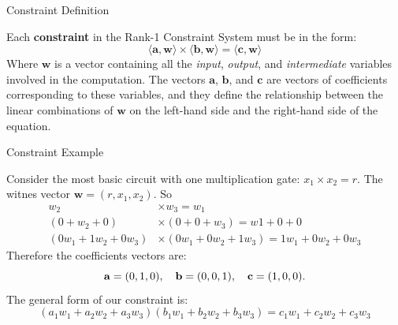\documentclass{zkdl-presentation-template}
\begin{document}
    \begin{frame}{Constraint Definition}
        \begin{definition}
            Each \textbf{constraint} in the Rank-1 Constraint System must be in the form:
            \begin{equation*}
                \langle \mathbf{a}, \mathbf{w}\rangle \times \langle \mathbf{b}, \mathbf{w}\rangle = \langle \mathbf{c}, \mathbf{w}\rangle
            \end{equation*}
            Where $\mathbf{w}$ is a vector containing all the \textit{input}, \textit{output}, and 
            \textit{intermediate} variables involved in the computation. The vectors $\mathbf{a}$, 
            $\mathbf{b}$, and $\mathbf{c}$ are vectors of coefficients corresponding to these variables, 
            and they define the relationship between the linear combinations of $\mathbf{w}$ on the 
            left-hand side and the right-hand side of the equation.
        \end{definition}        
    \end{frame}

    \begin{frame}{Constraint Example}
        \begin{example}
            Consider the most basic circuit with one multiplication gate: $x_1 \times x_2 = r$.
            The witnes vector $\mathbf{w} = (r, x_1, x_2)$. So
            \vspace{-5pt}
            \begin{align*}
                w_2 &\times w_3 = w_1 \\
                (0 + w_2 + 0) &\times (0 + 0 + w_3) = w1 + 0 + 0 \\
                (0w_1 + 1w_2 + 0w_3) &\times (0w_1 + 0w_2 + 1w_3) = 1w_1 + 0w_2 + 0w_3
            \end{align*}
            Therefore the coefficients vectors are:
            \vspace{-5pt}
            \begin{equation*}
                \mathbf{a} = (0, 1, 0), \quad \mathbf{b} = (0, 0, 1), \quad \mathbf{c} = (1, 0, 0). 
                \vspace{-5pt}
            \end{equation*}
            The general form of our constraint is:
            \vspace{-5pt}
            \begin{equation*}
                (a_1w_1 + a_2w_2 + a_3w_3)(b_1w_1 + b_2w_2 + b_3w_3) = c_1w_1 + c_2w_2 + c_3w_3
            \end{equation*}
        \end{example}
    \end{frame}
\end{document}
